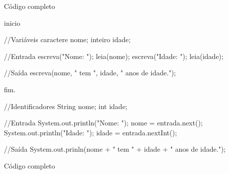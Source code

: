 \documentclass[
  letterpaper,
  DIV=11,
  numbers=noendperiod]{scrreprt}
\newenvironment{Shaded}{\begin{snugshade}}{\end{snugshade}}
\newcommand{\AttributeTok}[1]{\textcolor[rgb]{0.40,0.45,0.13}{#1}}
\newcommand{\BuiltInTok}[1]{\textcolor[rgb]{0.00,0.23,0.31}{#1}}
\newcommand{\CommentTok}[1]{\textcolor[rgb]{0.37,0.37,0.37}{#1}}
\newcommand{\FunctionTok}[1]{\textcolor[rgb]{0.28,0.35,0.67}{#1}}
\newcommand{\NormalTok}[1]{\textcolor[rgb]{0.00,0.23,0.31}{#1}}
\newcommand{\OperatorTok}[1]{\textcolor[rgb]{0.37,0.37,0.37}{#1}}
\newcommand{\StringTok}[1]{\textcolor[rgb]{0.13,0.47,0.30}{#1}}
\begin{document}
Código completo

\begin{Shaded}
\begin{Highlighting}[]
\NormalTok{  inicio}

    \CommentTok{//Variáveis}
\NormalTok{    caractere nome}\OperatorTok{;}
\NormalTok{    inteiro idade}\OperatorTok{;}

    \CommentTok{//Entrada}
\NormalTok{    escreva}\OperatorTok{(}\StringTok{"Nome: "}\OperatorTok{);}
\NormalTok{    leia}\OperatorTok{(}\NormalTok{nome}\OperatorTok{);}
\NormalTok{    escreva}\OperatorTok{(}\StringTok{"Idade: "}\OperatorTok{);}
\NormalTok{    leia}\OperatorTok{(}\NormalTok{idade}\OperatorTok{);}

    \CommentTok{//Saída}
\NormalTok{    escreva}\OperatorTok{(}\NormalTok{nome}\OperatorTok{,} \StringTok{" tem "}\OperatorTok{,}\NormalTok{ idade}\OperatorTok{,} \StringTok{" anos de idade."}\OperatorTok{);}

\NormalTok{  fim}\OperatorTok{.}
\end{Highlighting}
\end{Shaded}

\begin{Shaded}
\begin{Highlighting}[]
  \CommentTok{//Identificadores}
  \BuiltInTok{String}\NormalTok{ nome}\OperatorTok{;}
\NormalTok{  int idade}\OperatorTok{;}

  \CommentTok{//Entrada}
\NormalTok{  System}\OperatorTok{.}\AttributeTok{out}\OperatorTok{.}\FunctionTok{println}\NormalTok{(}\StringTok{"Nome: "}\NormalTok{)}\OperatorTok{;}
\NormalTok{  nome }\OperatorTok{=}\NormalTok{ entrada}\OperatorTok{.}\FunctionTok{next}\NormalTok{()}\OperatorTok{;}
\NormalTok{  System}\OperatorTok{.}\AttributeTok{out}\OperatorTok{.}\FunctionTok{println}\NormalTok{(}\StringTok{"Idade: "}\NormalTok{)}\OperatorTok{;}
\NormalTok{  idade }\OperatorTok{=}\NormalTok{ entrada}\OperatorTok{.}\FunctionTok{nextInt}\NormalTok{()}\OperatorTok{;}

  \CommentTok{//Saída}
\NormalTok{  System}\OperatorTok{.}\AttributeTok{out}\OperatorTok{.}\FunctionTok{prinln}\NormalTok{(nome }\OperatorTok{+} \StringTok{" tem "} \OperatorTok{+}\NormalTok{ idade }\OperatorTok{+} \StringTok{" anos de idade."}\NormalTok{)}\OperatorTok{;}
\end{Highlighting}
\end{Shaded}

Código completo
\end{document}
